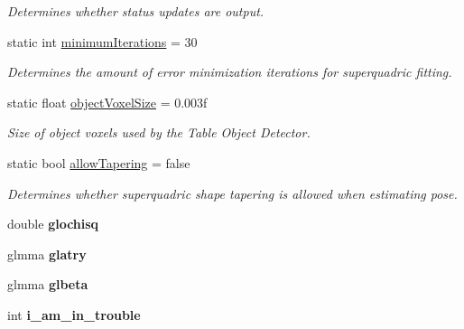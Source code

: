 \begin{DoxyCompactItemize}
\begin{DoxyCompactList}\small\item\em Determines whether status updates are output. \end{DoxyCompactList}\item 
\hypertarget{namespaceope_a329355110ed86b61fe7367b63fa72bd4}{static int \hyperlink{namespaceope_a329355110ed86b61fe7367b63fa72bd4}{minimum\-Iterations} = 30}\label{namespaceope_a329355110ed86b61fe7367b63fa72bd4}

\begin{DoxyCompactList}\small\item\em Determines the amount of error minimization iterations for superquadric fitting. \end{DoxyCompactList}\item 
\hypertarget{namespaceope_a4913e9b003b9d770a92be33369b86282}{static float \hyperlink{namespaceope_a4913e9b003b9d770a92be33369b86282}{object\-Voxel\-Size} = 0.\-003f}\label{namespaceope_a4913e9b003b9d770a92be33369b86282}

\begin{DoxyCompactList}\small\item\em Size of object voxels used by the Table Object Detector. \end{DoxyCompactList}\item 
\hypertarget{namespaceope_ac5fb81e886ace44291f4013cc1d477ca}{static bool \hyperlink{namespaceope_ac5fb81e886ace44291f4013cc1d477ca}{allow\-Tapering} = false}\label{namespaceope_ac5fb81e886ace44291f4013cc1d477ca}

\begin{DoxyCompactList}\small\item\em Determines whether superquadric shape tapering is allowed when estimating pose. \end{DoxyCompactList}\item 
\hypertarget{namespaceope_a65b01fb30a5b99971861ad9cf74e9fd4}{double {\bfseries glochisq}}\label{namespaceope_a65b01fb30a5b99971861ad9cf74e9fd4}

\item 
\hypertarget{namespaceope_ab3e12483568976e219ef898d6b102c0b}{glmma {\bfseries glatry}}\label{namespaceope_ab3e12483568976e219ef898d6b102c0b}

\item 
\hypertarget{namespaceope_ab1f31b4264baefaa892eed99057d7c57}{glmma {\bfseries glbeta}}\label{namespaceope_ab1f31b4264baefaa892eed99057d7c57}

\item 
\hypertarget{namespaceope_ad27bde5e2262715f03aadd9f67f60acb}{int {\bfseries i\-\_\-am\-\_\-in\-\_\-trouble}}\label{namespaceope_ad27bde5e2262715f03aadd9f67f60acb}

\end{DoxyCompactItemize}



